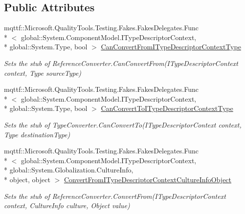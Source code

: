 \subsection*{Public Attributes}
\begin{DoxyCompactItemize}
\item 
mqttf\-::\-Microsoft.\-Quality\-Tools.\-Testing.\-Fakes.\-Fakes\-Delegates.\-Func\\*
$<$ global\-::\-System.\-Component\-Model.\-I\-Type\-Descriptor\-Context, \\*
global\-::\-System.\-Type, bool $>$ \hyperlink{class_system_1_1_component_model_1_1_fakes_1_1_stub_reference_converter_ac9c084bd2a574c138334e07b362dbc30}{Can\-Convert\-From\-I\-Type\-Descriptor\-Context\-Type}
\begin{DoxyCompactList}\small\item\em Sets the stub of Reference\-Converter.\-Can\-Convert\-From(\-I\-Type\-Descriptor\-Context context, Type source\-Type)\end{DoxyCompactList}\item 
mqttf\-::\-Microsoft.\-Quality\-Tools.\-Testing.\-Fakes.\-Fakes\-Delegates.\-Func\\*
$<$ global\-::\-System.\-Component\-Model.\-I\-Type\-Descriptor\-Context, \\*
global\-::\-System.\-Type, bool $>$ \hyperlink{class_system_1_1_component_model_1_1_fakes_1_1_stub_reference_converter_a4275dd9d19844044294457db585bedb4}{Can\-Convert\-To\-I\-Type\-Descriptor\-Context\-Type}
\begin{DoxyCompactList}\small\item\em Sets the stub of Type\-Converter.\-Can\-Convert\-To(\-I\-Type\-Descriptor\-Context context, Type destination\-Type)\end{DoxyCompactList}\item 
mqttf\-::\-Microsoft.\-Quality\-Tools.\-Testing.\-Fakes.\-Fakes\-Delegates.\-Func\\*
$<$ global\-::\-System.\-Component\-Model.\-I\-Type\-Descriptor\-Context, \\*
global\-::\-System.\-Globalization.\-Culture\-Info, \\*
object, object $>$ \hyperlink{class_system_1_1_component_model_1_1_fakes_1_1_stub_reference_converter_a9ad852eac3f7f673c0903a0c243b9f35}{Convert\-From\-I\-Type\-Descriptor\-Context\-Culture\-Info\-Object}
\begin{DoxyCompactList}\small\item\em Sets the stub of Reference\-Converter.\-Convert\-From(\-I\-Type\-Descriptor\-Context context, Culture\-Info culture, Object value)\end{DoxyCompactList}\item 

\end{DoxyCompactItemize}
